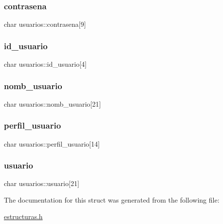 \subsubsection{\texorpdfstring{contrasena}{contrasena}}
{\footnotesize\ttfamily char usuarios\+::contrasena\mbox{[}9\mbox{]}}

\mbox{\label{structusuarios_a5090e2f56888f1a9873bd9ed35bf46d3}} 
\subsubsection{\texorpdfstring{id\+\_\+usuario}{id\_usuario}}
{\footnotesize\ttfamily char usuarios\+::id\+\_\+usuario\mbox{[}4\mbox{]}}

\mbox{\label{structusuarios_acf2d33748c720f047d2a0e512e187fd5}} 
\subsubsection{\texorpdfstring{nomb\+\_\+usuario}{nomb\_usuario}}
{\footnotesize\ttfamily char usuarios\+::nomb\+\_\+usuario\mbox{[}21\mbox{]}}

\mbox{\label{structusuarios_afe590222f989c0e30b72bbc0014868cc}} 
\subsubsection{\texorpdfstring{perfil\+\_\+usuario}{perfil\_usuario}}
{\footnotesize\ttfamily char usuarios\+::perfil\+\_\+usuario\mbox{[}14\mbox{]}}

\mbox{\label{structusuarios_a3330601c31921ae73c6fa7551a68a0da}} 
\subsubsection{\texorpdfstring{usuario}{usuario}}
{\footnotesize\ttfamily char usuarios\+::usuario\mbox{[}21\mbox{]}}



The documentation for this struct was generated from the following file\+:\begin{DoxyCompactItemize}
\item 
\mbox{\hyperlink{estructuras_8h}{estructuras.\+h}}\end{DoxyCompactItemize}
